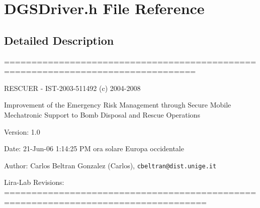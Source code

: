 \section{DGSDriver.h File Reference}
\label{DGSDriver_8h}
 




\subsection{Detailed Description}
=================================================================================

RESCUER - IST-2003-511492 (c) 2004-2008

Improvement of the Emergency Risk Management through Secure Mobile Mechatronic Support to Bomb Disposal and Rescue Operations

\begin{Desc}
\item[Version:]1.0 \end{Desc}
\begin{Desc}
\item[Date:]21-Jun-06 1:14:25 PM ora solare Europa occidentale \end{Desc}
\begin{Desc}
\item[Author:]Carlos Beltran Gonzalez (Carlos), {\tt cbeltran@dist.unige.it} 

Lira-Lab Revisions: ===================================================================================\end{Desc}
